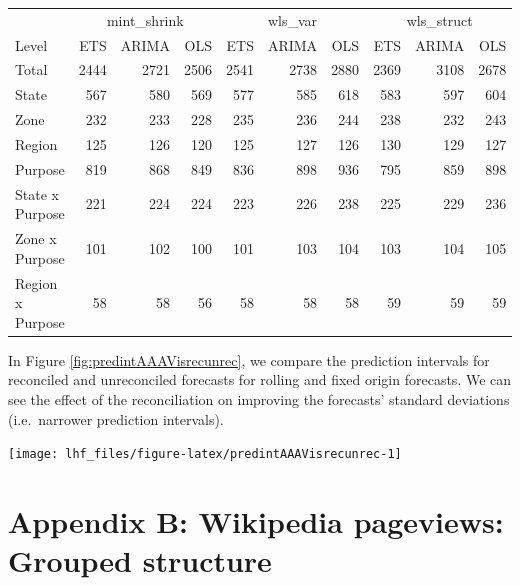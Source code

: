 \documentclass[11pt,a4paper,]{article}
\let\origfigure\figure
\let\endorigfigure\endfigure
\renewenvironment{figure}[1][2] {
    \expandafter\origfigure\expandafter[!htbp]
} {
    \endorigfigure
}
\let\origtable\table
\let\endorigtable\endtable
\renewenvironment{table}[1][2] {
    \expandafter\origtable\expandafter[!htbp]
} {
    \endorigtable
}
\begin{document}
\begin{table}

\caption{\label{tab:Tourismdatadifrecfix}Comparing Mean(RMSE) of three   different reconciliation matrices for fixed origin forecasts on a 24 months test set.}
\centering
\begin{tabular}[t]{lrrrrrrrrr}
\toprule
\multicolumn{1}{c}{} & \multicolumn{3}{c}{mint\_shrink} & \multicolumn{3}{c}{wls\_var} & \multicolumn{3}{c}{wls\_struct} \\
\cmidrule(l{3pt}r{3pt}){2-4} \cmidrule(l{3pt}r{3pt}){5-7} \cmidrule(l{3pt}r{3pt}){8-10}
Level & ETS & ARIMA & OLS & ETS & ARIMA & OLS & ETS & ARIMA & OLS\\
\midrule
Total & 2444 & 2721 & 2506 & 2541 & 2738 & 2880 & 2369 & 3108 & 2678\\
State & 567 & 580 & 569 & 577 & 585 & 618 & 583 & 597 & 604\\
Zone & 232 & 233 & 228 & 235 & 236 & 244 & 238 & 232 & 243\\
Region & 125 & 126 & 120 & 125 & 127 & 126 & 130 & 129 & 127\\
Purpose & 819 & 868 & 849 & 836 & 898 & 936 & 795 & 859 & 898\\
State x Purpose & 221 & 224 & 224 & 223 & 226 & 238 & 225 & 229 & 236\\
Zone x Purpose & 101 & 102 & 100 & 101 & 103 & 104 & 103 & 104 & 105\\
Region x Purpose & 58 & 58 & 56 & 58 & 58 & 58 & 59 & 59 & 59\\
\bottomrule
\end{tabular}
\end{table}

In Figure \ref{fig:predintAAAVisrecunrec}, we compare the prediction intervals for reconciled and unreconciled forecasts for rolling and fixed origin forecasts. We can see the effect of the reconciliation on improving the forecasts' standard deviations (i.e.~narrower prediction intervals).

\begin{figure}

{\centering \texttt{[image: lhf\_files/figure-latex/predintAAAVisrecunrec-1]} 

}

\caption{Comparing forecasts and prediction intervals of 'AAAVis' bottom-level series across methods. Left: rolling origin. Right: fixed origin.}\label{fig:predintAAAVisrecunrec}
\end{figure}

\hypertarget{appendix-b-wikipedia-pageviews-grouped-structure}{%
\section{Appendix B: Wikipedia pageviews: Grouped structure}\label{appendix-b-wikipedia-pageviews-grouped-structure}}
\end{document}
